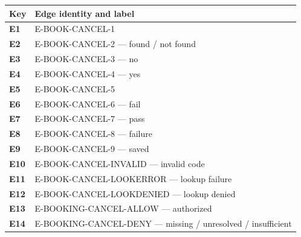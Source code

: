 \documentclass[11pt,a4paper]{article}
\begin{document}
\Needspace{\dimexpr\ht\AtlasGraphBox+\dp\AtlasGraphBox+1.50cm\relax}
\hypertarget{figure-GRAPH-BOOKING-CANCEL}{}
\par
{}\par
\begin{center}\usebox{\AtlasGraphBox}\end{center}
\begingroup\small\setlength{\LTleft}{0pt}\setlength{\LTright}{0pt}
\begin{longtable}{@{}p{.07\linewidth}p{.90\linewidth}@{}}
\textbf{Key} & \textbf{Edge identity and label}\\\midrule\endhead
\textbf{E1} & E-\allowbreak{}BOOK-\allowbreak{}CANCEL-\allowbreak{}1\\
\textbf{E2} & E-\allowbreak{}BOOK-\allowbreak{}CANCEL-\allowbreak{}2 --- found / not found\\
\textbf{E3} & E-\allowbreak{}BOOK-\allowbreak{}CANCEL-\allowbreak{}3 --- no\\
\textbf{E4} & E-\allowbreak{}BOOK-\allowbreak{}CANCEL-\allowbreak{}4 --- yes\\
\textbf{E5} & E-\allowbreak{}BOOK-\allowbreak{}CANCEL-\allowbreak{}5\\
\textbf{E6} & E-\allowbreak{}BOOK-\allowbreak{}CANCEL-\allowbreak{}6 --- fail\\
\textbf{E7} & E-\allowbreak{}BOOK-\allowbreak{}CANCEL-\allowbreak{}7 --- pass\\
\textbf{E8} & E-\allowbreak{}BOOK-\allowbreak{}CANCEL-\allowbreak{}8 --- failure\\
\textbf{E9} & E-\allowbreak{}BOOK-\allowbreak{}CANCEL-\allowbreak{}9 --- saved\\
\textbf{E10} & E-\allowbreak{}BOOK-\allowbreak{}CANCEL-\allowbreak{}INVALID --- invalid code\\
\textbf{E11} & E-\allowbreak{}BOOK-\allowbreak{}CANCEL-\allowbreak{}LOOKERROR --- lookup failure\\
\textbf{E12} & E-\allowbreak{}BOOK-\allowbreak{}CANCEL-\allowbreak{}LOOKDENIED --- lookup denied\\
\textbf{E13} & E-\allowbreak{}BOOKING-\allowbreak{}CANCEL-\allowbreak{}ALLOW --- authorized\\
\textbf{E14} & E-\allowbreak{}BOOKING-\allowbreak{}CANCEL-\allowbreak{}DENY --- missing / unresolved / insufficient\\
\end{longtable}\endgroup
\end{document}
